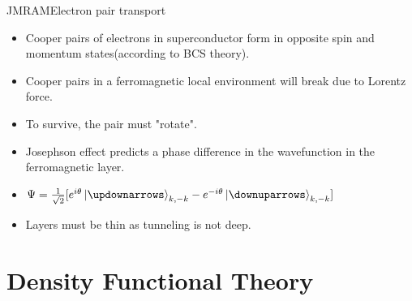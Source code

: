 \documentclass{beamer}
\begin{document}
\begin{frame}{JMRAM}{Electron pair transport}
\begin{itemize}
    \item {Cooper pairs of electrons in superconductor form in opposite spin and momentum states(according to BCS theory).}
    \item{Cooper pairs in a ferromagnetic local environment will break due to Lorentz force.}
    \item{To survive, the pair must "rotate".}
    \item{Josephson effect predicts a phase difference in the wavefunction in the ferromagnetic layer.}
    \item{$\Psi=\frac{1}{\sqrt{2}}[e^{i\theta}\ket{\updownarrows}_{k,-k}- e^{-i\theta}\ket{\downuparrows}_{k,-k}]$\cite{contact}}
    \item{Layers must be thin as tunneling is not deep.}
\end{itemize}
\end{frame}

\section{Density Functional Theory}
\end{document}
